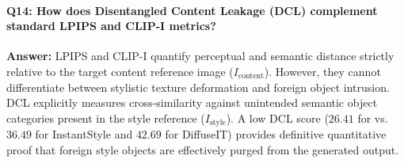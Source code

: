 \paragraph{Q14: How does Disentangled Content Leakage (DCL) complement standard LPIPS and CLIP-I metrics?}
\textbf{Answer:} LPIPS and CLIP-I quantify perceptual and semantic distance strictly relative to the target content reference image ($I_{\text{content}}$). However, they cannot differentiate between stylistic texture deformation and foreign object intrusion. DCL explicitly measures cross-similarity against unintended semantic object categories present in the style reference ($I_{\text{style}}$). A low DCL score ($26.41$ for \method vs. $36.49$ for InstantStyle and $42.69$ for DiffuseIT) provides definitive quantitative proof that foreign style objects are effectively purged from the generated output.
